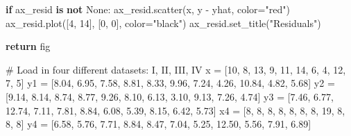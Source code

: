 \documentclass[
  letterpaper,
  DIV=11,
  numbers=noendperiod]{scrreprt}
\newenvironment{Shaded}{\begin{snugshade}}{\end{snugshade}}
\newcommand{\CommentTok}[1]{\textcolor[rgb]{0.37,0.37,0.37}{#1}}
\newcommand{\ControlFlowTok}[1]{\textcolor[rgb]{0.00,0.23,0.31}{\textbf{#1}}}
\newcommand{\DecValTok}[1]{\textcolor[rgb]{0.68,0.00,0.00}{#1}}
\newcommand{\FloatTok}[1]{\textcolor[rgb]{0.68,0.00,0.00}{#1}}
\newcommand{\KeywordTok}[1]{\textcolor[rgb]{0.00,0.23,0.31}{\textbf{#1}}}
\newcommand{\NormalTok}[1]{\textcolor[rgb]{0.00,0.23,0.31}{#1}}
\newcommand{\OperatorTok}[1]{\textcolor[rgb]{0.37,0.37,0.37}{#1}}
\newcommand{\StringTok}[1]{\textcolor[rgb]{0.13,0.47,0.30}{#1}}
\newcommand{\VariableTok}[1]{\textcolor[rgb]{0.07,0.07,0.07}{#1}}
\begin{document}
\begin{Shaded}
\begin{Highlighting}[]
    \ControlFlowTok{if}\NormalTok{ ax\_resid }\KeywordTok{is} \KeywordTok{not} \VariableTok{None}\NormalTok{:}
\NormalTok{        ax\_resid.scatter(x, y }\OperatorTok{{-}}\NormalTok{ yhat, color}\OperatorTok{=}\StringTok{"red"}\NormalTok{)}
\NormalTok{        ax\_resid.plot([}\DecValTok{4}\NormalTok{, }\DecValTok{14}\NormalTok{], [}\DecValTok{0}\NormalTok{, }\DecValTok{0}\NormalTok{], color}\OperatorTok{=}\StringTok{"black"}\NormalTok{)}
\NormalTok{        ax\_resid.set\_title(}\StringTok{"Residuals"}\NormalTok{)}

    \ControlFlowTok{return}\NormalTok{ fig}
\end{Highlighting}
\end{Shaded}

\begin{Shaded}
\begin{Highlighting}[]
\CommentTok{\# Load in four different datasets: I, II, III, IV}
\NormalTok{x }\OperatorTok{=}\NormalTok{ [}\DecValTok{10}\NormalTok{, }\DecValTok{8}\NormalTok{, }\DecValTok{13}\NormalTok{, }\DecValTok{9}\NormalTok{, }\DecValTok{11}\NormalTok{, }\DecValTok{14}\NormalTok{, }\DecValTok{6}\NormalTok{, }\DecValTok{4}\NormalTok{, }\DecValTok{12}\NormalTok{, }\DecValTok{7}\NormalTok{, }\DecValTok{5}\NormalTok{]}
\NormalTok{y1 }\OperatorTok{=}\NormalTok{ [}\FloatTok{8.04}\NormalTok{, }\FloatTok{6.95}\NormalTok{, }\FloatTok{7.58}\NormalTok{, }\FloatTok{8.81}\NormalTok{, }\FloatTok{8.33}\NormalTok{, }\FloatTok{9.96}\NormalTok{, }\FloatTok{7.24}\NormalTok{, }\FloatTok{4.26}\NormalTok{, }\FloatTok{10.84}\NormalTok{, }\FloatTok{4.82}\NormalTok{, }\FloatTok{5.68}\NormalTok{]}
\NormalTok{y2 }\OperatorTok{=}\NormalTok{ [}\FloatTok{9.14}\NormalTok{, }\FloatTok{8.14}\NormalTok{, }\FloatTok{8.74}\NormalTok{, }\FloatTok{8.77}\NormalTok{, }\FloatTok{9.26}\NormalTok{, }\FloatTok{8.10}\NormalTok{, }\FloatTok{6.13}\NormalTok{, }\FloatTok{3.10}\NormalTok{, }\FloatTok{9.13}\NormalTok{, }\FloatTok{7.26}\NormalTok{, }\FloatTok{4.74}\NormalTok{]}
\NormalTok{y3 }\OperatorTok{=}\NormalTok{ [}\FloatTok{7.46}\NormalTok{, }\FloatTok{6.77}\NormalTok{, }\FloatTok{12.74}\NormalTok{, }\FloatTok{7.11}\NormalTok{, }\FloatTok{7.81}\NormalTok{, }\FloatTok{8.84}\NormalTok{, }\FloatTok{6.08}\NormalTok{, }\FloatTok{5.39}\NormalTok{, }\FloatTok{8.15}\NormalTok{, }\FloatTok{6.42}\NormalTok{, }\FloatTok{5.73}\NormalTok{]}
\NormalTok{x4 }\OperatorTok{=}\NormalTok{ [}\DecValTok{8}\NormalTok{, }\DecValTok{8}\NormalTok{, }\DecValTok{8}\NormalTok{, }\DecValTok{8}\NormalTok{, }\DecValTok{8}\NormalTok{, }\DecValTok{8}\NormalTok{, }\DecValTok{8}\NormalTok{, }\DecValTok{19}\NormalTok{, }\DecValTok{8}\NormalTok{, }\DecValTok{8}\NormalTok{, }\DecValTok{8}\NormalTok{]}
\NormalTok{y4 }\OperatorTok{=}\NormalTok{ [}\FloatTok{6.58}\NormalTok{, }\FloatTok{5.76}\NormalTok{, }\FloatTok{7.71}\NormalTok{, }\FloatTok{8.84}\NormalTok{, }\FloatTok{8.47}\NormalTok{, }\FloatTok{7.04}\NormalTok{, }\FloatTok{5.25}\NormalTok{, }\FloatTok{12.50}\NormalTok{, }\FloatTok{5.56}\NormalTok{, }\FloatTok{7.91}\NormalTok{, }\FloatTok{6.89}\NormalTok{]}


\end{Highlighting}
\end{Shaded}
\end{document}
